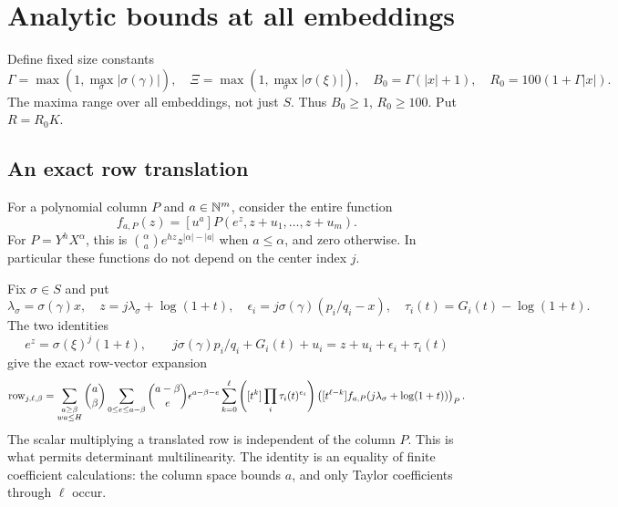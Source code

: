 \section{Analytic bounds at all embeddings}\label{sec:analysis}

Define fixed size constants
\[
 \Gamma=\max\left(1,\max_\sigma|\sigma(\gamma)|\right),\quad
 \Xi=\max\left(1,\max_\sigma|\sigma(\xi)|\right),\quad
 B_0=\Gamma(|x|+1),\quad R_0=100(1+\Gamma|x|).
\]
The maxima range over all embeddings, not just \(S\).
Thus \(B_0\ge1\), \(R_0\ge100\). Put \(R=R_0K\).

\subsection{An exact row translation}

For a polynomial column \(P\) and \(a\in\mathbb N^m\), consider the
entire function
\begin{equation}\label{eq:entire}
 f_{a,P}(z)=[u^a]P(e^z,z+u_1,\ldots,z+u_m).
\end{equation}
For \(P=Y^hX^\alpha\), this is
\(\binom{\alpha}{a}e^{hz}z^{|\alpha|-|a|}\) when \(a\le\alpha\),
and zero otherwise. In particular these functions do not depend on
the center index \(j\).

Fix \(\sigma\in S\) and put
\[
 \lambda_\sigma=\sigma(\gamma)x,\quad
 z=j\lambda_\sigma+\log(1+t),\quad
 \epsilon_i=j\sigma(\gamma)(p_i/q_i-x),\quad
 \tau_i(t)=G_i(t)-\log(1+t).
\]
The two identities
\[
 e^z=\sigma(\xi)^j(1+t),\qquad
 j\sigma(\gamma)p_i/q_i+G_i(t)+u_i
       =z+u_i+\epsilon_i+\tau_i(t)
\]
give the exact row-vector expansion
\begin{equation}\label{eq:row-expansion}
 \begin{split}
 {\rm row}_{j,\ell,\beta}
 =\sum_{\substack{a\ge\beta\\wa\le H}}\binom a\beta
   \sum_{0\le e\le a-\beta}\binom{a-\beta}{e}
       \epsilon^{a-\beta-e}
   \sum_{k=0}^{\ell}
    \left([t^k]\prod_i\tau_i(t)^{e_i}\right)
    \left([t^{\ell-k}]
       f_{a,P}(j\lambda_\sigma+\log(1+t))\right)_P .
 \end{split}
\end{equation}
The scalar multiplying a translated row is independent of the column
\(P\). This is what permits determinant multilinearity.
The identity is an equality of finite coefficient calculations:
the column space bounds \(a\), and only Taylor coefficients through
\(\ell\) occur.

